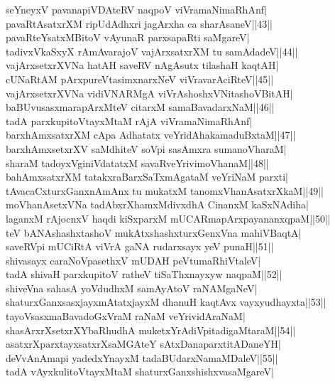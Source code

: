 \documentclass{article}
\begin{document}
seYneyxV pavanapiVDAteRV naqpoV viVramaNimaRhAnf|\\
pavaRtAsatxrXM ripUdAdhxri jagArxha ca sharAsaneV||43||\\
pavaRteYsatxMBitoV vAyunaR parxsapaRti saMgareV|\\
tadivxVkaSxyX rAmAvarajoV vajArxsatxrXM tu samAdadeV||44||\\
vajArxsetxrXVNa hatAH saveRV nAgAsutx tilashaH kaqtAH|\\
cUNaRtAM pArxpureVtasimxnarxNeV viVravarAciRteV||45||\\
vajArxsetxrXVNa vidiVNARMgA viVrAshoshxVNitashoVBitAH|\\
baBUvusasxmarapArxMteV citarxM samaBavadarxNaM||46||\\
tadA parxkupitoVtayxMtaM rAjA viVramaNimaRhAnf|\\
barxhAmxsatxrXM cApa Adhatatx veYridAhakamaduBxtaM||47||\\
barxhAmxsetxrXV saMdhiteV soVpi sasAmxra sumanoVharaM|\\
sharaM tadoyxVginiVdatatxM savaRveYrivimoVhanaM||48||\\
bahAmxsatxrXM tatakxraBarxSaTxmAgataM veYriNaM parxti|\\
tAvacaCxturxGanxnAmAnx tu mukatxM tanomxVhanAsatxrXkaM||49||\\
moVhanAsetxVNa tadAbxrXhamxMdivxdhA CinanxM kaSxNAdiha|\\
laganxM rAjocnxV haqdi kiSxparxM mUCARmapArxpayananxqpaM||50||\\
teV bANAshashxtashoV mukAtxshashxturxGenxVna mahiVBaqtA|\\
saveRVpi mUCiRtA viVrA gaNA rudarxsayx yeV punaH||51||\\
shivasayx caraNoVpasethxV mUDAH peVtumaRhiVtaleV|\\
tadA shivaH parxkupitoV ratheV tiSaThxnayxyw naqpaM||52||\\
shiveVna sahasA yoVdudhxM samAyAtoV raNAMgaNeV|\\
shaturxGanxsasxjayxmAtatxjayxM dhanuH kaqtAvx vayxyudhayxta||53||\\
tayoVsasxmaBavadoGxVraM raNaM veYrividAraNaM|\\
shasArxrXsetxrXYbaRhudhA muketxYrAdiVpitadigaMtaraM||54||\\
asatxrXparxtayxsatxrXsaMGAteY sAtxDanaparxtitADaneYH|\\
deVvAnAmapi yadedxYnayxM tadaBUdarxNamaMDaleV||55||\\
tadA vAyxkulitoVtayxMtaM shaturxGanxshishxvasaMgareV|\\
\end{document}
